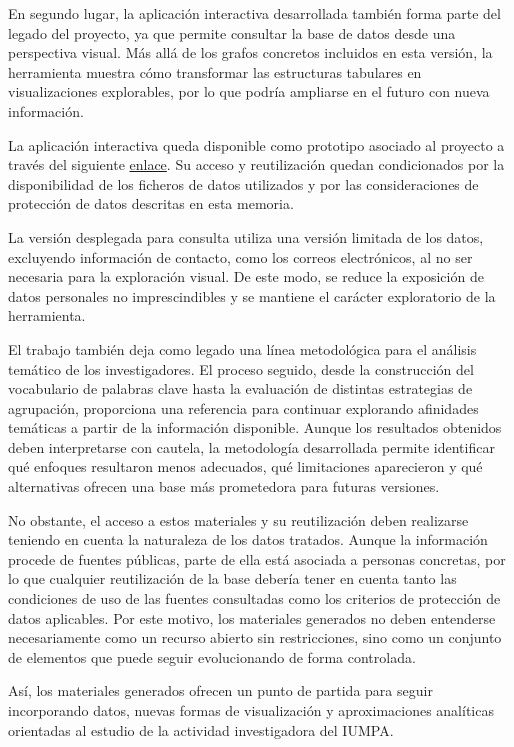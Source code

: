 \documentclass[11pt,spanish,listoffigures,listoftables]{tfgetsinf}
\begin{document}
En segundo lugar, la aplicación interactiva desarrollada también forma parte del legado del proyecto, ya que permite consultar la base de datos desde una perspectiva visual. Más allá de los grafos concretos incluidos en esta versión, la herramienta muestra cómo transformar las estructuras tabulares en visualizaciones explorables, por lo que podría ampliarse en el futuro con nueva información.

La aplicación interactiva queda disponible como prototipo asociado al proyecto a través del siguiente \href{https://cu2y3u-jos0antonio-rodr0guez0moreno.shinyapps.io/iumpa-grafos/}{enlace}. Su acceso y reutilización quedan condicionados por la disponibilidad de los ficheros de datos utilizados y por las consideraciones de protección de datos descritas en esta memoria.

La versión desplegada para consulta utiliza una versión limitada de los datos, excluyendo información de contacto, como los correos electrónicos, al no ser necesaria para la exploración visual. De este modo, se reduce la exposición de datos personales no imprescindibles y se mantiene el carácter exploratorio de la herramienta.

El trabajo también deja como legado una línea metodológica para el análisis temático de los investigadores. El proceso seguido, desde la construcción del vocabulario de palabras clave hasta la evaluación de distintas estrategias de agrupación, proporciona una referencia para continuar explorando afinidades temáticas a partir de la información disponible. Aunque los resultados obtenidos deben interpretarse con cautela, la metodología desarrollada permite identificar qué enfoques resultaron menos adecuados, qué limitaciones aparecieron y qué alternativas ofrecen una base más prometedora para futuras versiones.

No obstante, el acceso a estos materiales y su reutilización deben realizarse teniendo en cuenta la naturaleza de los datos tratados. Aunque la información procede de fuentes públicas, parte de ella está asociada a personas concretas, por lo que cualquier reutilización de la base debería tener en cuenta tanto las condiciones de uso de las fuentes consultadas como los criterios de protección de datos aplicables. Por este motivo, los materiales generados no deben entenderse necesariamente como un recurso abierto sin restricciones, sino como un conjunto de elementos que puede seguir evolucionando de forma controlada.

Así, los materiales generados ofrecen un punto de partida para seguir incorporando datos, nuevas formas de visualización y aproximaciones analíticas orientadas al estudio de la actividad investigadora del IUMPA.
\end{document}
